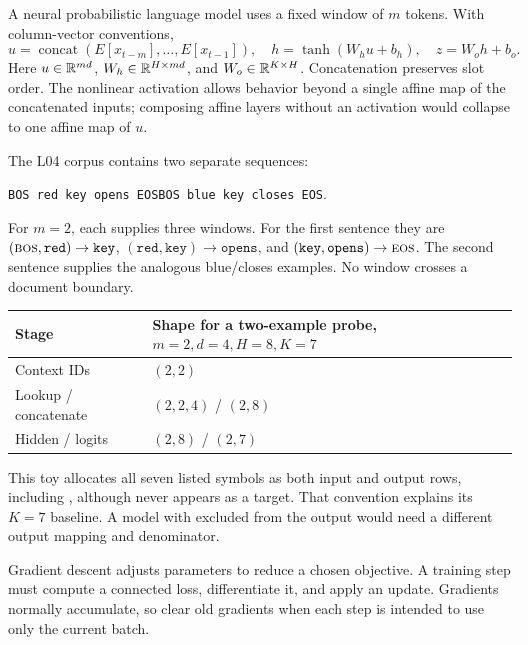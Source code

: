 
A neural probabilistic language model uses a fixed window of $m$ tokens.
With column-vector conventions,
\[
 u=\operatorname{concat}(E[x_{t-m}],\ldots,E[x_{t-1}]),\quad
 h=\tanh(W_hu+b_h),\quad z=W_oh+b_o.
\]
Here $u\in\mathbb{R}^{md}$, $W_h\in\mathbb{R}^{H\times md}$, and
$W_o\in\mathbb{R}^{K\times H}$. Concatenation preserves slot order. The nonlinear
activation allows behavior beyond a single affine map of the concatenated
inputs; composing affine layers without an activation would collapse to
one affine map of $u$.

The L04 corpus contains two separate sequences:
\begin{center}
\texttt{BOS red key opens EOS}\qquad\texttt{BOS blue key closes EOS}.
\end{center}
For $m=2$, each supplies three windows. For the first sentence they are
$(\textsc{bos},\texttt{red})\to\texttt{key}$,
$(\texttt{red},\texttt{key})\to\texttt{opens}$, and
$(\texttt{key},\texttt{opens})\to\textsc{eos}$. The second sentence supplies
the analogous blue/closes examples. No window crosses a document boundary.

\begin{tabularx}{\textwidth}{@{}l Y@{}}\toprule
Stage & Shape for a two-example probe, $m=2,d=4,H=8,K=7$\\\midrule
Context IDs & $(2,2)$\\
Lookup / concatenate & $(2,2,4)$ / $(2,8)$\\
Hidden / logits & $(2,8)$ / $(2,7)$\\\bottomrule
\end{tabularx}

This toy allocates all seven listed symbols as both input and output rows,
including \BOS{}, although \BOS{} never appears as a target. That convention
explains its $K=7$ baseline. A model with \BOS{} excluded from the output
would need a different output mapping and denominator.


Gradient descent adjusts parameters to reduce a chosen objective. A
training step must compute a connected loss, differentiate it, and apply
an update. Gradients normally accumulate, so clear old gradients when
each step is intended to use only the current batch.

